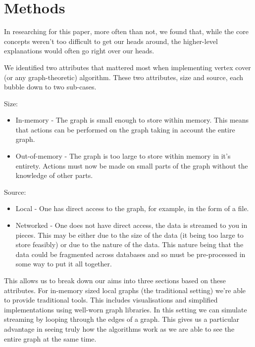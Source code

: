 \section{Methods}

In researching for this paper, more often than not, we found that, while the
core concepts weren't too difficult to get our heads around, the higher-level
explanations would often go right over our heads.

We identified two attributes that mattered most when implementing vertex cover
(or any graph-theoretic) algorithm. These two attributes, size and source, each
bubble down to two sub-cases.

Size:

\begin{itemize}
    \item
          In-memory - The graph is small enough to store within memory. This
          means that actions can be performed on the graph taking in account
          the entire graph.
    \item
          Out-of-memory - The graph is too large to store within memory in it's
          entirety. Actions must now be made on small parts of the graph
          without the knowledge of other parts.
\end{itemize}

Source:

\begin{itemize}
    \item
          Local - One has direct access to the graph, for example, in the form
          of a file.
    \item
          Networked - One does not have direct access, the data is streamed to
          you in pieces. This may be either due to the size of the data (it
          being too large to store feasibly) or due to the nature of the data.
          This nature being that the data could be fragmented across databases
          and so must be pre-processed in some way to put it all together.
\end{itemize}

This allows us to break down our aims into three sections based on these
attributes. For in-memory sized local graphs (the traditional setting) we're
able to provide traditional tools. This includes visualisations and simplified
implementations using well-worn graph libraries. In this setting we can
simulate streaming by looping through the edges of a graph. This gives us a
particular advantage in seeing truly how the algorithms work as we are able to
see the entire graph at the same time.

